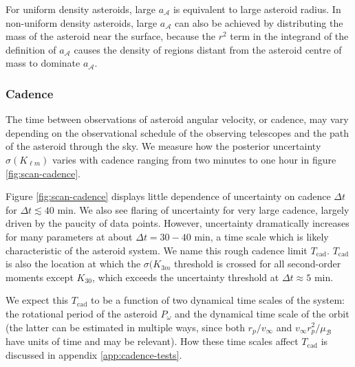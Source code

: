 \documentclass[fleqn,usenatbib]{mnras}
\newcommand{\brackets}[1]{\left[ #1 \right]}
\begin{document}
For uniform density asteroids, large $a_\mathcal{A}$ is equivalent to large asteroid radius. In non-uniform density asteroids, large $a_\mathcal{A}$ can also be achieved by distributing the mass of the asteroid near the surface, because the $r^2$ term in the integrand of the definition of $a_\mathcal{A}$ causes the density of regions distant from the asteroid centre of mass to dominate $a_\mathcal{A}$.




\subsubsection{Cadence}
\label{sec:scan-cadence}

The time between observations of asteroid angular velocity, or cadence, may vary depending on the observational schedule of the observing telescopes and the path of the asteroid through the sky.  We measure how the posterior uncertainty $\sigma(K_{\ell m})$ varies with cadence ranging from two minutes to one hour in figure \ref{fig:scan-cadence}.

Figure \ref{fig:scan-cadence} displays little dependence of uncertainty on cadence $\Delta t$ for $\Delta t \lesssim 40$ min. We also see flaring of uncertainty for very large cadence, largely driven by the paucity of data points. However, uncertainty dramatically increases for many parameters at about $\Delta t = 30-40$ min, a time scale which is likely characteristic of the asteroid system.  We name this rough cadence limit $T_\text{cad}$. $T_\text{cad}$ is also the location at which the $\sigma(K_{3m}$ threshold is crossed for all second-order moments except $K_{30}$, which exceeds the uncertainty threshold at $\Delta t \approx 5$ min.

We expect this $T_\text{cad}$ to be a function of two dynamical time scales of the system: the rotational period of the asteroid $P_\omega$ and the dynamical time scale of the orbit (the latter can be estimated in multiple ways, since both $r_p / v_\infty$ and $v_\infty r_p^2 / \mu_\mathcal{B}$ have units of time and may be relevant). How these time scales affect $T_\text{cad}$ is discussed in appendix \ref{app:cadence-tests}.
\end{document}
